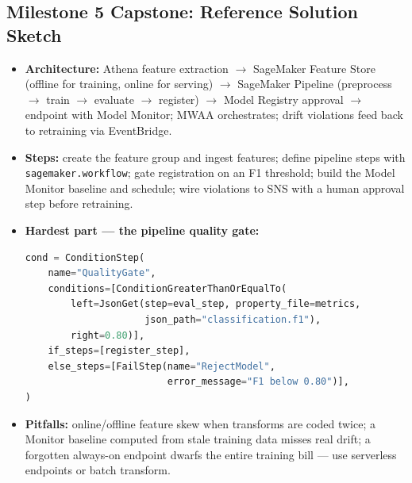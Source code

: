 \documentclass[11pt, a4paper]{article}
\begin{document}
\subsection*{Milestone 5 Capstone: Reference Solution Sketch}
\begin{itemize}[label=-, itemsep=0pt]
    \item \textbf{Architecture:} Athena feature extraction $\rightarrow$ SageMaker Feature Store (offline for training, online for serving) $\rightarrow$ SageMaker Pipeline (preprocess $\rightarrow$ train $\rightarrow$ evaluate $\rightarrow$ register) $\rightarrow$ Model Registry approval $\rightarrow$ endpoint with Model Monitor; MWAA orchestrates; drift violations feed back to retraining via EventBridge.
    \item \textbf{Steps:} create the feature group and ingest features; define pipeline steps with \texttt{sagemaker.workflow}; gate registration on an F1 threshold; build the Model Monitor baseline and schedule; wire violations to SNS with a human approval step before retraining.
    \item \textbf{Hardest part --- the pipeline quality gate:}
\begin{lstlisting}[language=Python]
cond = ConditionStep(
    name="QualityGate",
    conditions=[ConditionGreaterThanOrEqualTo(
        left=JsonGet(step=eval_step, property_file=metrics,
                     json_path="classification.f1"),
        right=0.80)],
    if_steps=[register_step],
    else_steps=[FailStep(name="RejectModel",
                         error_message="F1 below 0.80")],
)
\end{lstlisting}
    \item \textbf{Pitfalls:} online/offline feature skew when transforms are coded twice; a Monitor baseline computed from stale training data misses real drift; a forgotten always-on endpoint dwarfs the entire training bill --- use serverless endpoints or batch transform.
\end{itemize}
\end{document}
